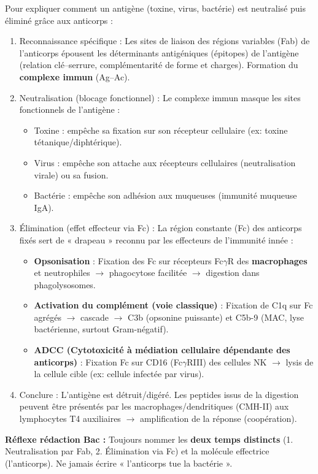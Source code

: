 \documentclass[11pt]{article}
\newcommand{\cle}[1]{{\popxbold\color{popdark}#1}}
\begin{document}
\begin{methode}
Pour expliquer comment un antigène (toxine, virus, bactérie) est neutralisé puis éliminé grâce aux anticorps :
\begin{enumerate}
\item \cle{Reconnaissance spécifique} : Les sites de liaison des régions variables (Fab) de l'anticorps épousent les déterminants antigéniques (épitopes) de l'antigène (relation clé--serrure, complémentarité de forme et charges). Formation du \textbf{complexe immun} (Ag--Ac).
\item \cle{Neutralisation (blocage fonctionnel)} : Le complexe immun masque les sites fonctionnels de l'antigène : 
\begin{itemize}
\item Toxine : empêche sa fixation sur son récepteur cellulaire (ex: toxine tétanique/diphtérique).
\item Virus : empêche son attache aux récepteurs cellulaires (neutralisation virale) ou sa fusion.
\item Bactérie : empêche son adhésion aux muqueuses (immunité muqueuse IgA).
\end{itemize}
\item \cle{Élimination (effet effecteur via Fc)} : La région constante (Fc) des anticorps fixés sert de « drapeau » reconnu par les effecteurs de l'immunité innée :
\begin{itemize}
\item \textbf{Opsonisation} : Fixation des Fc sur récepteurs Fc$\gamma$R des \textbf{macrophages} et neutrophiles $\rightarrow$ phagocytose facilitée $\rightarrow$ digestion dans phagolysosomes.
\item \textbf{Activation du complément (voie classique)} : Fixation de C1q sur Fc agrégés $\rightarrow$ cascade $\rightarrow$ C3b (opsonine puissante) et C5b-9 (MAC, lyse bactérienne, surtout Gram-négatif).
\item \textbf{ADCC (Cytotoxicité à médiation cellulaire dépendante des anticorps)} : Fixation Fc sur CD16 (Fc$\gamma$RIII) des cellules NK $\rightarrow$ lysis de la cellule cible (ex: cellule infectée par virus).
\end{itemize}
\item \cle{Conclure} : L'antigène est détruit/digéré. Les peptides issus de la digestion peuvent être présentés par les macrophages/dendritiques (CMH-II) aux lymphocytes T4 auxiliaires $\rightarrow$ amplification de la réponse (coopération).
\end{enumerate}
\textbf{Réflexe rédaction Bac :} Toujours nommer les \textbf{deux temps distincts} (1. Neutralisation par Fab, 2. Élimination via Fc) et la molécule effectrice (l'anticorps). Ne jamais écrire « l'anticorps tue la bactérie ».
\end{methode}
\end{document}
